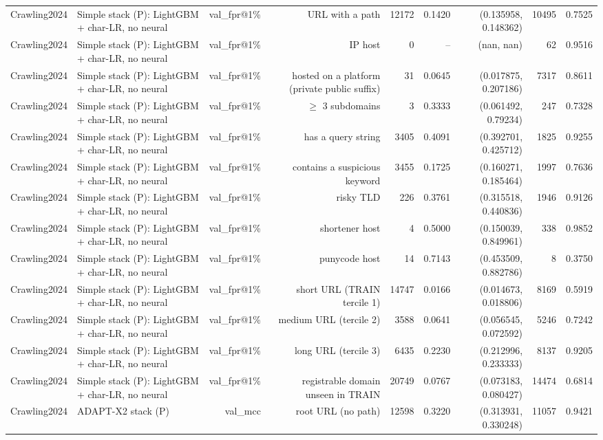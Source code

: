 \begin{table}[t]
\begin{tabular}{llrrrrrrr}
Crawling2024 & Simple stack (P): LightGBM + char-LR, no neural & val\_fpr@1\% & URL with a path & 12172 & 0.1420 & (0.135958, 0.148362) & 10495 & 0.7525 \\
Crawling2024 & Simple stack (P): LightGBM + char-LR, no neural & val\_fpr@1\% & IP host & 0 & -- & (nan, nan) & 62 & 0.9516 \\
Crawling2024 & Simple stack (P): LightGBM + char-LR, no neural & val\_fpr@1\% & hosted on a platform (private public suffix) & 31 & 0.0645 & (0.017875, 0.207186) & 7317 & 0.8611 \\
Crawling2024 & Simple stack (P): LightGBM + char-LR, no neural & val\_fpr@1\% & $\geq$ 3 subdomains & 3 & 0.3333 & (0.061492, 0.79234) & 247 & 0.7328 \\
Crawling2024 & Simple stack (P): LightGBM + char-LR, no neural & val\_fpr@1\% & has a query string & 3405 & 0.4091 & (0.392701, 0.425712) & 1825 & 0.9255 \\
Crawling2024 & Simple stack (P): LightGBM + char-LR, no neural & val\_fpr@1\% & contains a suspicious keyword & 3455 & 0.1725 & (0.160271, 0.185464) & 1997 & 0.7636 \\
Crawling2024 & Simple stack (P): LightGBM + char-LR, no neural & val\_fpr@1\% & risky TLD & 226 & 0.3761 & (0.315518, 0.440836) & 1946 & 0.9126 \\
Crawling2024 & Simple stack (P): LightGBM + char-LR, no neural & val\_fpr@1\% & shortener host & 4 & 0.5000 & (0.150039, 0.849961) & 338 & 0.9852 \\
Crawling2024 & Simple stack (P): LightGBM + char-LR, no neural & val\_fpr@1\% & punycode host & 14 & 0.7143 & (0.453509, 0.882786) & 8 & 0.3750 \\
Crawling2024 & Simple stack (P): LightGBM + char-LR, no neural & val\_fpr@1\% & short URL (TRAIN tercile 1) & 14747 & 0.0166 & (0.014673, 0.018806) & 8169 & 0.5919 \\
Crawling2024 & Simple stack (P): LightGBM + char-LR, no neural & val\_fpr@1\% & medium URL (tercile 2) & 3588 & 0.0641 & (0.056545, 0.072592) & 5246 & 0.7242 \\
Crawling2024 & Simple stack (P): LightGBM + char-LR, no neural & val\_fpr@1\% & long URL (tercile 3) & 6435 & 0.2230 & (0.212996, 0.233333) & 8137 & 0.9205 \\
Crawling2024 & Simple stack (P): LightGBM + char-LR, no neural & val\_fpr@1\% & registrable domain unseen in TRAIN & 20749 & 0.0767 & (0.073183, 0.080427) & 14474 & 0.6814 \\
Crawling2024 & ADAPT-X2 stack (P) & val\_mcc & root URL (no path) & 12598 & 0.3220 & (0.313931, 0.330248) & 11057 & 0.9421 \\

\end{tabular}
\end{table}
